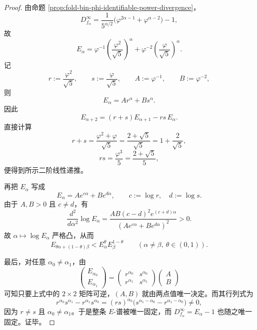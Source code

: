 \begin{proof}
由命题 \ref{prop:fold-bin-phi-identifiable-power-divergence}，
\[
D_{f_\alpha}^\infty
=
\frac{1}{5^{\alpha/2}}\bigl(\varphi^{2\alpha-1}+\varphi^{\alpha-2}\bigr)-1,
\]
故
\[
E_\alpha
=
\varphi^{-1}\left(\frac{\varphi^2}{\sqrt5}\right)^\alpha
+
\varphi^{-2}\left(\frac{\varphi}{\sqrt5}\right)^\alpha.
\]
记
\[
r:=\frac{\varphi^2}{\sqrt5},
\qquad
s:=\frac{\varphi}{\sqrt5},
\qquad
A:=\varphi^{-1},
\qquad
B:=\varphi^{-2},
\]
则
\[
E_\alpha=Ar^\alpha+Bs^\alpha.
\]
因此
\[
E_{\alpha+2}=(r+s)E_{\alpha+1}-rs\,E_\alpha.
\]
直接计算
\[
r+s=\frac{\varphi^2+\varphi}{\sqrt5}
=
\frac{2+\sqrt5}{\sqrt5}
=
1+\frac{2}{\sqrt5},
\]
\[
rs=\frac{\varphi^3}{5}
=
\frac{2+\sqrt5}{5},
\]
便得到所示二阶线性递推。

再把 \(E_\alpha\) 写成
\[
E_\alpha=Ae^{c\alpha}+Be^{d\alpha},
\qquad
c:=\log r,\quad d:=\log s.
\]
由于 \(A,B>0\) 且 \(c\neq d\)，有
\[
\frac{d^2}{d\alpha^2}\log E_\alpha
=
\frac{AB(c-d)^2e^{(c+d)\alpha}}{(Ae^{c\alpha}+Be^{d\alpha})^2}
>0.
\]
故 \(\alpha\mapsto \log E_\alpha\) 严格凸，从而
\[
E_{\theta\alpha+(1-\theta)\beta}<E_\alpha^\theta E_\beta^{1-\theta}
\qquad
(\alpha\neq\beta,\ \theta\in(0,1)).
\]

最后，对任意 \(\alpha_0\neq \alpha_1\)，由
\[
\begin{pmatrix}
E_{\alpha_0}\\[2pt]
E_{\alpha_1}
\end{pmatrix}
=
\begin{pmatrix}
r^{\alpha_0} & s^{\alpha_0}\\
r^{\alpha_1} & s^{\alpha_1}
\end{pmatrix}
\begin{pmatrix}
A\\
B
\end{pmatrix}
\]
可知只要上式中的 \(2\times 2\) 矩阵可逆，\((A,B)\) 就由两点值唯一决定。而其行列式为
\[
r^{\alpha_0}s^{\alpha_1}-r^{\alpha_1}s^{\alpha_0}
=(rs)^{\alpha_0}\bigl(s^{\alpha_1-\alpha_0}-r^{\alpha_1-\alpha_0}\bigr)\neq 0,
\]
因为 \(r\neq s\) 且 \(\alpha_0\neq \alpha_1\)。于是整条 \(E\)-谱被唯一固定，而 \(D_{f_\alpha}^\infty=E_\alpha-1\) 也随之唯一固定。证毕。
\end{proof}

